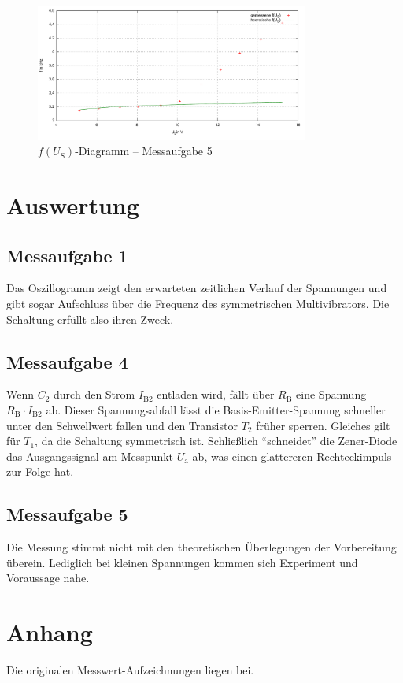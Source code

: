 \documentclass[numbers=noenddot,10pt,a4paper]{scrartcl}
\newcommand{\indx}[1]{_\text{#1}}
\begin{document}
\begin{figure}[H]
\centering
\includegraphics[width=0.8\textwidth]{messwerteUf.pdf}
\caption{$f(U\indx{S})$-Diagramm -- Messaufgabe 5}
\end{figure}
\section{Auswertung}
\subsection{Messaufgabe 1}
Das Oszillogramm zeigt den erwarteten zeitlichen Verlauf der Spannungen und gibt sogar Aufschluss über die Frequenz des symmetrischen Multivibrators. Die Schaltung erfüllt also ihren Zweck.
\subsection{Messaufgabe 4}
Wenn $C_2$ durch den Strom $I\indx{B2}$ entladen wird, fällt über $R\indx{B}$ eine Spannung $R\indx{B}\cdot I\indx{B2}$ ab. Dieser Spannungsabfall lässt die Basis-Emitter-Spannung schneller unter den Schwellwert fallen und den Transistor $T_2$ früher sperren. Gleiches gilt für $T_1$, da die Schaltung symmetrisch ist. Schließlich "`schneidet"' die Zener-Diode das Ausgangssignal am Messpunkt $U\indx{a}$ ab, was einen glattereren Rechteckimpuls zur Folge hat.
\subsection{Messaufgabe 5}
Die Messung stimmt nicht mit den theoretischen Überlegungen der Vorbereitung überein. Lediglich bei kleinen Spannungen kommen sich Experiment und Voraussage nahe.
\section{Anhang}
Die originalen Messwert-Aufzeichnungen liegen bei.
\end{document}
